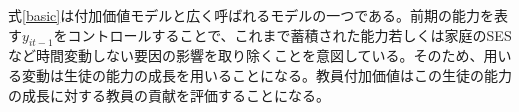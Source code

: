 \documentclass[a4paper,12pt]{article}
\begin{document}


式\ref{basic}は付加価値モデルと広く呼ばれるモデルの一つである\citep{todd2003specification}。前期の能力を表す$y_{it-1}$をコントロールすることで、これまで蓄積された能力若しくは家庭のSESなど時間変動しない要因の影響を取り除くことを意図している。そのため、用いる変動は生徒の能力の成長を用いることになる。教員付加価値はこの生徒の能力の成長に対する教員の貢献を評価することになる。

\end{document}
